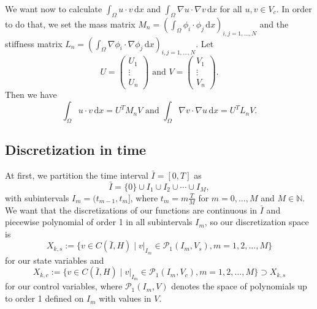 We want now to calculate $\int_\Omega u \cdot v \,\mathrm{d}x$ and $\int_\Omega \nabla u \cdot \nabla v \,\mathrm{d}x$ for all $u,v\in  V_c$. In order to do that, we set the mass matrix $M_n = \left(\int_\Omega \phi_i \cdot \phi_j \,\mathrm{d}x\right)_{i,j=1,\dotsc,N}$ and the stiffness matrix $L_n = \left(\int_\Omega \nabla\phi_i \cdot \nabla\phi_j \,\mathrm{d}x\right)_{i,j=1,\dotsc,N}$. Let%
\begin{displaymath}
U=\begin{pmatrix} U_1 \\ \vdots \\ U_n \end{pmatrix}\text{ and }V=\begin{pmatrix} V_1 \\ \vdots \\ V_n \end{pmatrix}.
\end{displaymath}
Then we have
\begin{displaymath}
\int_\Omega u \cdot v \,\mathrm{d}x=U^TM_nV\text{ and }\int_\Omega \nabla v \cdot \nabla u \,\mathrm{d}x=U^TL_nV.
\end{displaymath}


\subsection{Discretization in time}
At first, we partition the time interval $\bar{I}=[0,T]$ as
\begin{displaymath}
\bar{I}=\{0\}\cup I_1\cup I_2\cup\dotsb\cup I_M,
\end{displaymath}
with subintervals $I_m=(t_{m-1},t_m]$, where $t_m=m\frac{T}{M}$ for $m=0,\dotsc, M$ and $M\in\mathbb{N}$. We want that the discretizations of our functions are continuous in $\bar{I}$ and piecewise polynomial of order 1 in all subintervals $I_m$, so our discretization space is
\begin{displaymath}
X_{k,s}:=\{v\in C(\bar{I},H)\mid v |_{I_m}\in\mathcal{P}_1(I_m,V_s),m=1,2,\dotsc,M\}
\end{displaymath}
for our state variables and
\begin{displaymath}
X_{k,c}:=\{v\in C(\bar{I},H)\mid v |_{I_m}\in\mathcal{P}_1(I_m,V_c),m=1,2,\dotsc,M\}\supset X_{k,s}
\end{displaymath}
for our control variables, where $\mathcal{P}_1(I_m,V)$ denotes the space of polynomials up to order 1 defined on $I_m$ with values in $V$.


